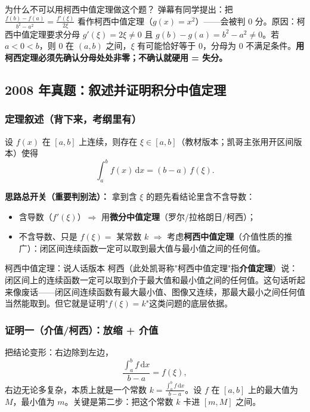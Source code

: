 \documentclass[a4paper]{article}
\begin{document}
\begin{warningbox}{为什么不可以用柯西中值定理做这个题？}
弹幕有同学提出：把 $\frac{f(b)-f(a)}{b^2-a^2}=\frac{f'(\xi)}{2\xi}$ 看作柯西中值定理（$g(x)=x^2$）——会被判 0 分。原因：柯西中值定理要求分母 $g'(\xi)=2\xi\neq 0$ 且 $g(b)-g(a)=b^2-a^2\neq 0$。若 $a<0<b$，则 $0$ 在 $(a,b)$ 之间，$\xi$ 有可能恰好等于 $0$，分母为 0 不满足条件。\textbf{用柯西定理必须先确认分母处处非零；不确认就硬用 = 失分。}
\end{warningbox}

\subsection{2008 年真题：叙述并证明积分中值定理}

\subsubsection{定理叙述（背下来，考纲里有）}

设 $f(x)$ 在 $[a,b]$ 上连续，则存在 $\xi\in[a,b]$（教材版本；凯哥主张用开区间版本）使得
\[
\int_a^b f(x)\,\mathrm{d}x = (b-a)\,f(\xi).
\]

\textbf{思路总开关（重要判别法）：} 拿到含 $\xi$ 的题先看结论里含不含导数：
\begin{itemize}
\item 含导数（$f'(\xi)$）$\Rightarrow$ 用\textbf{微分中值定理}（罗尔/拉格朗日/柯西）；
\item 不含导数、只是 $f(\xi)=$ 某常数 $k$ $\Rightarrow$ 考虑\textbf{柯西中值定理}（介值性质的推广）：闭区间连续函数一定可以取到最大值与最小值之间的任何值。
\end{itemize}

\begin{knowledgebox}{柯西中值定理：说人话版本}
柯西（此处凯哥称"柯西中值定理"指\textbf{介值定理}）说：闭区间上的连续函数一定可以取到介于最大值和最小值之间的任何值。这句话听起来像废话——闭区间连续函数有最大最小值、图像又连续，那最大最小之间任何值当然能取到。但它就是证明"$f(\xi)=k$"这类问题的底层依据。
\end{knowledgebox}

\subsubsection{证明一（介值/柯西）：放缩 + 介值}

把结论变形：右边除到左边，
\[
\frac{\int_a^b f\,\mathrm{d}x}{b-a} = f(\xi),
\]
右边无论多复杂，本质上就是一个常数 $k=\frac{\int_a^b f\,\mathrm{d}x}{b-a}$。设 $f$ 在 $[a,b]$ 上的最大值为 $M$，最小值为 $m$。关键是第二步：把这个常数 $k$ 卡进 $[m,M]$ 之间。
\end{document}
